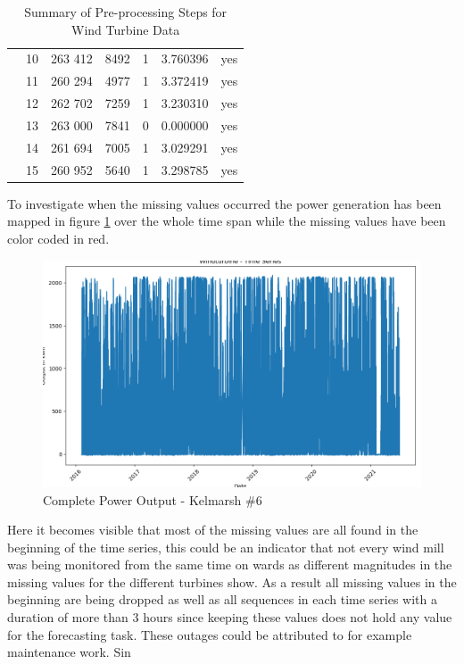 \documentclass{article}
\begin{document}
\begin{table}[!ht]
\begin{tabular}{l|c|r|r|r|S|r}
            & 10 & 263 412 & 8492 & 1 & 3.760396 & yes \\
            & 11 & 260 294 & 4977 & 1 & 3.372419 & yes \\
            & 12 & 262 702 & 7259 & 1 & 3.230310 & yes \\
            & 13 & 263 000 & 7841 & 0 & 0.000000 & yes \\
            & 14 & 261 694 & 7005 & 1 & 3.029291 & yes \\
            & 15 & 260 952 & 5640 & 1 & 3.298785 & yes \\
    \bottomrule
    \end{tabular}
\caption{Summary of Pre-processing Steps for Wind Turbine Data}
\label{tab:preprocessing_windturbines}
\end{table}

To investigate when the missing values occurred the power generation has been mapped in figure \ref{fig:Kelmarsh-missing-values} over the whole time span while the missing values have been color coded in red.
\begin{figure}
    \centering
    \includegraphics[width=\linewidth]{graphs/data/Windturbine - Time Series.png}
    \caption{Complete Power Output - Kelmarsh \#6}
    \label{fig:Kelmarsh-missing-values}
\end{figure}

Here it becomes visible that most of the missing values are all found in the beginning of the time series, this could be an indicator that not every wind mill was being monitored from the same time on wards as different magnitudes in the missing values for the different turbines show. As a result all missing values in the beginning are being dropped as well as all sequences in each time series with a duration of more than 3 hours since keeping these values does not hold any value for the forecasting task. These outages could be attributed to for example maintenance work. Sin
\end{document}
